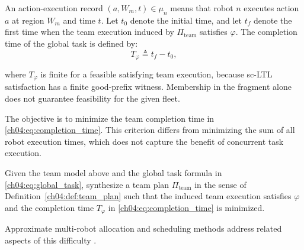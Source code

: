 An action-execution record $(a, W_{m}, t) \in \mu_{n}$ means that robot $n$
executes action $a$ at region $W_{m}$ and time $t$. Let $t_{0}$ denote the
initial time, and let $t_{f}$ denote the first time when the team execution
induced by $\Pi_{\mathrm{team}}$ satisfies $\varphi$. The completion time of
the global task is defined by:
\begin{equation}
\label{ch04:eq:completion_time}
T_{\varphi} \triangleq t_{f} - t_{0},
\end{equation}
\begin{revision}
where $T_{\varphi}$ is finite for a feasible satisfying team execution,
because sc-LTL satisfaction has a finite good-prefix witness. Membership
in the fragment alone does not guarantee feasibility for the given fleet.
\end{revision} The objective is to minimize the team completion time in
\eqref{ch04:eq:completion_time}. This criterion differs from minimizing the sum
of all robot execution times, which does not capture the benefit of concurrent
task execution.

\begin{problem}
\label{ch04:prob:global_task_assignment}
Given the team model above and the global task formula
in \eqref{ch04:eq:global_task}, synthesize a team plan
$\Pi_{\mathrm{team}}$ in the sense of
Definition~\ref{ch04:def:team_plan} such that the induced team execution
satisfies $\varphi$ and the completion time $T_{\varphi}$ in
\eqref{ch04:eq:completion_time} is minimized.
\end{problem}

 Approximate multi-robot
allocation and scheduling methods address related aspects of this difficulty
\citep{khamis2015multi,hoos2004stochastic}.













